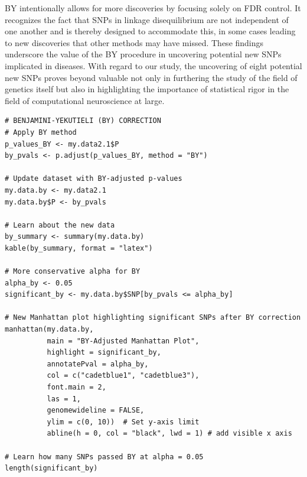 \documentclass[12pt]{article}
\begin{document}
BY intentionally allows for more discoveries by focusing solely on FDR control. It recognizes the fact that SNPs in linkage disequilibrium are not independent of one another and is thereby designed to accommodate this, in some cases leading to new discoveries that other methods may have missed. These findings underscore the value of the BY procedure in uncovering potential new SNPs implicated in diseases. With regard to our study, the uncovering of eight potential new SNPs proves beyond valuable not only in furthering the study of the field of genetics itself but also in highlighting the importance of statistical rigor in the field of computational neuroscience at large. \par

\begin{lstlisting}[style=Rstyle]
# BENJAMINI-YEKUTIELI (BY) CORRECTION
# Apply BY method
p_values_BY <- my.data2.1$P
by_pvals <- p.adjust(p_values_BY, method = "BY")

# Update dataset with BY-adjusted p-values
my.data.by <- my.data2.1
my.data.by$P <- by_pvals

# Learn about the new data
by_summary <- summary(my.data.by)
kable(by_summary, format = "latex")

# More conservative alpha for BY
alpha_by <- 0.05
significant_by <- my.data.by$SNP[by_pvals <= alpha_by]

# New Manhattan plot highlighting significant SNPs after BY correction
manhattan(my.data.by,
          main = "BY-Adjusted Manhattan Plot",
          highlight = significant_by,
          annotatePval = alpha_by,
          col = c("cadetblue1", "cadetblue3"),
          font.main = 2,
          las = 1,
          genomewideline = FALSE,
          ylim = c(0, 10))  # Set y-axis limit
          abline(h = 0, col = "black", lwd = 1) # add visible x axis

# Learn how many SNPs passed BY at alpha = 0.05
length(significant_by)
\end{lstlisting}
\clearpage
\end{document}
